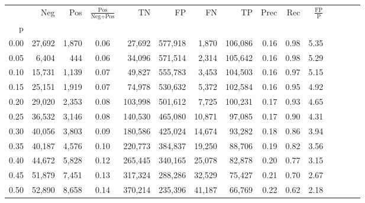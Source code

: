 \begin{tabular}{rrrcrrrrrrrrrrr}
\toprule
{} &     Neg &    Pos & $\frac{\text{Pos}}{\text{Neg}+\text{Pos}}$ &       TN &       FP &       FN &       TP &  Prec &   Rec & $\frac{\text{FP}}{\text{P}}$ \\
p    &         &        &                                            &          &          &          &          &       &       &                              \\
\midrule
0.00 &  27,692 &  1,870 &                                       0.06 &   27,692 &  577,918 &    1,870 &  106,086 &  0.16 &  0.98 &                         5.35 \\
0.05 &   6,404 &    444 &                                       0.06 &   34,096 &  571,514 &    2,314 &  105,642 &  0.16 &  0.98 &                         5.29 \\
0.10 &  15,731 &  1,139 &                                       0.07 &   49,827 &  555,783 &    3,453 &  104,503 &  0.16 &  0.97 &                         5.15 \\
0.15 &  25,151 &  1,919 &                                       0.07 &   74,978 &  530,632 &    5,372 &  102,584 &  0.16 &  0.95 &                         4.92 \\
0.20 &  29,020 &  2,353 &                                       0.08 &  103,998 &  501,612 &    7,725 &  100,231 &  0.17 &  0.93 &                         4.65 \\
0.25 &  36,532 &  3,146 &                                       0.08 &  140,530 &  465,080 &   10,871 &   97,085 &  0.17 &  0.90 &                         4.31 \\
0.30 &  40,056 &  3,803 &                                       0.09 &  180,586 &  425,024 &   14,674 &   93,282 &  0.18 &  0.86 &                         3.94 \\
0.35 &  40,187 &  4,576 &                                       0.10 &  220,773 &  384,837 &   19,250 &   88,706 &  0.19 &  0.82 &                         3.56 \\
0.40 &  44,672 &  5,828 &                                       0.12 &  265,445 &  340,165 &   25,078 &   82,878 &  0.20 &  0.77 &                         3.15 \\
0.45 &  51,879 &  7,451 &                                       0.13 &  317,324 &  288,286 &   32,529 &   75,427 &  0.21 &  0.70 &                         2.67 \\
0.50 &  52,890 &  8,658 &                                       0.14 &  370,214 &  235,396 &   41,187 &   66,769 &  0.22 &  0.62 &                         2.18 \\

\end{tabular}
